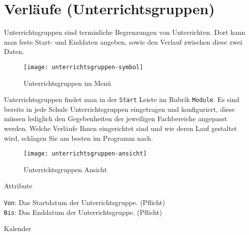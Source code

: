 \section{Verläufe (Unterrichtsgruppen)}
\label{sec:unterrichtsgruppen}

\noindent
Unterrichtsgruppen sind terminliche Begrenzungen von Unterrichten. Dort kann man feste Start- und Enddaten angeben, sowie den Verlauf zwischen diese zwei Daten.\\

\begin{wrapfigure}{r}{0.4\textwidth}
	\vspace{-14pt}
	\centering
	\texttt{[image: unterrichtsgruppen-symbol]}
	\vspace{-5pt}
	\caption{Unterrichtsgruppen im Menü}
\end{wrapfigure}

\noindent
Unterrichtsgruppen findet man in der \texttt{Start} Leiste im Rubrik \texttt{Module}. Es sind bereits in jede Schule Unterrichtsgruppen eingetragen und konfiguriert, diese müssen lediglich den Gegebenheiten der jeweiligen Fachbereiche angepasst werden. Welche Verläufe Ihnen eingerichtet sind und wie deren Lauf gestaltet wird, schlagen Sie am besten im Programm nach.\\

\begin{wrapfigure}{r}{0.4\textwidth}
	\label{fig:unterrichtsgruppen-symbol}
	\centering
	\texttt{[image: unterrichtsgruppen-ansicht]}
	\vspace{-5pt}
	\caption{Unterrichtsgruppen Ansicht}
	\label{fig:unterrichtsgruppen-ansicht}
	\vspace{-115pt}
\end{wrapfigure}

\noindent
{\large Attribute\par}
\vspace{8pt}

\noindent
\texttt{Von}: Das Startdatum der Unterrichtsgruppe. (Pflicht)\\

\noindent
\texttt{Bis}: Das Enddatum der Unterrichtsgruppe. (Pflicht)\\

\vspace{54pt}

\noindent
{\large Kalender\par}
\vspace{8pt}

